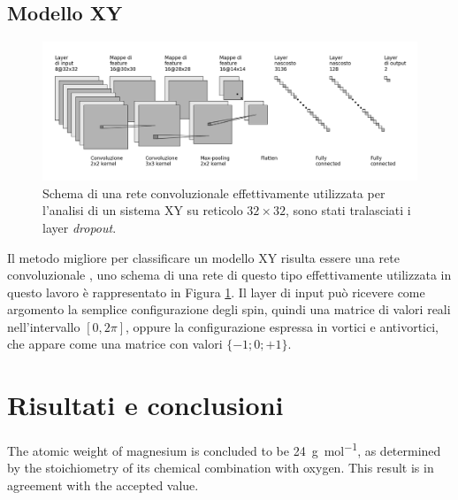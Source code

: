 \documentclass{article}
\begin{document}
\subsection{Modello XY}

\begin{figure}
 \centerline{\includegraphics[scale=0.35]{cnn.png}}
 \label{fig:cnn}
 \caption{Schema di una rete convoluzionale effettivamente utilizzata per l'analisi di un sistema XY su reticolo $32\times32$, sono stati tralasciati i layer \emph{dropout}.}
\end{figure}

Il metodo migliore per classificare un modello XY risulta essere una rete convoluzionale \cite{melko}, uno schema di una rete di questo tipo effettivamente utilizzata in questo lavoro è rappresentato in Figura \ref{fig:cnn}.
Il layer di input può ricevere come argomento la semplice configurazione degli spin, quindi una matrice di valori reali nell'intervallo $[0,2\pi]$, oppure la configurazione espressa in vortici e antivortici, che appare come una matrice con valori $\{-1;0;+1\}$.



\section{Risultati e conclusioni}

The atomic weight of magnesium is concluded to be \SI{24}{\gram\per\mol}, as determined by the stoichiometry of its chemical combination with oxygen. This result is in agreement with the accepted value.







\end{document}
